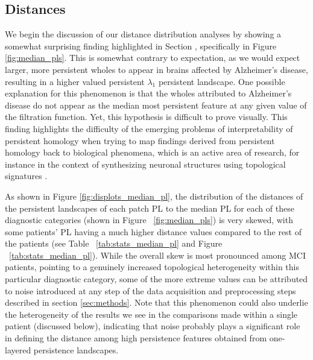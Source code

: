 \documentclass{article}
\begin{document}
\subsection{Distances}\label{sec:disc-dist}

We begin the discussion of our distance distribution analyses by showing a somewhat surprising
finding highlighted in Section \label{sec:results_between_images}, specifically in Figure
\ref{fig:median_pls}. This is somewhat contrary to expectation, as we would expect larger, more
persistent wholes to appear in brains affected by Alzheimer's disease, resulting in a higher valued
persistent $\lambda_1$ persistent landscape. One possible explanation for this phenomenon is that
the wholes attributed to Alzheimer's disease do not appear as the median most persistent feature at
any given value of the filtration function. Yet, this hypothesis is difficult to prove visually.
This finding highlights the difficulty of the emerging problems of interpretability of persistent
homology when trying to map findings derived from persistent homology back to biological phenomena,
which is an active area of research, for instance in the context of synthesizing neuronal structures
using topological signatures \citep{vanherpe2016framework}.

As shown in Figure \ref{fig:displots_median_pl}, the distribution of the distances of the persistent
landscapes of each patch PL to the median PL for each of these diagnostic categories (shown in
Figure ~\ref{fig:median_pls}) is very skewed, with some patients' PL having a much higher distance
values compared to the rest of the patients (see Table ~\ref{tab:stats_median_pl} and Figure
~\ref{tab:stats_median_pl}). While the overall skew is most pronounced among MCI patients, pointing
to a genuinely increased topological heterogeneity within this particular diagnostic category, some
of the more extreme values can be attributed to noise introduced at any step of the data acquisition
and preprocessing steps described in section \ref{sec:methods}. Note that this phenomenon could also
underlie the heterogeneity of the results we see in the comparisons made within a single patient
(discussed below), indicating that noise probably plays a significant role in defining the distance
among high persistence features obtained from one-layered persistence landscapes.
\end{document}
